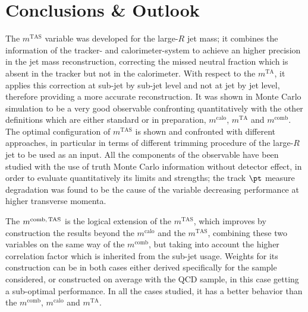 \documentclass[UKenglish,texlive=2013]{\ATLASLATEXPATH atlasdoc}
\newcommand{\mta}{\ensuremath{m^\textrm{TA}}\xspace}
\newcommand{\mtas}{\ensuremath{m^\textrm{TAS}}\xspace}
\newcommand{\mcal}{\ensuremath{m^\textrm{calo}}\xspace}
\newcommand{\mcomb}{\ensuremath{m^\textrm{comb}}\xspace}
\newcommand{\mcombtas}{\ensuremath{m^\textrm{comb,\,TAS}}\xspace}
\newcommand{\iqr}{\ensuremath{\frac{1}{2}\: \times\: 68\% \:\textrm{IQnR/median}}\xspace}
\begin{document}
\section{Conclusions \& Outlook}
\label{sec:conclusions}
The \mtas variable was developed for the large-$R$ jet mass; it combines the information of the tracker- and calorimeter-system to achieve an higher precision in the jet mass reconstruction, correcting the missed neutral fraction which is absent in the tracker but not in the calorimeter.
With respect to the $\mta$, it applies this correction at sub-jet by sub-jet level and not at jet by jet level, therefore providing a more accurate reconstruction. 
It was shown in Monte Carlo simulation to be a very good observable confronting quantitatively with the other definitions which are either standard or in preparation, $\mcal$, $\mta$ and $\mcomb$.
The optimal configuration of $\mtas$ is shown and confronted with different approaches, in particular in terms of different trimming procedure of the large-$R$ jet to be used as an input.
All the components of the observable have been studied with the use of truth Monte Carlo information without detector effect, in order to evaluate quantitatively its limits and strengths; the track $\pt$ measure degradation was found to be the cause of the variable decreasing performance at higher transverse momenta.

The $\mcombtas$ is the logical extension of the $\mtas$, which improves by construction the results beyond the $\mcal$ and the $\mtas$, combining these two variables on the same way of the $\mcomb$, but taking into account the higher correlation factor which is inherited from the sub-jet usage.
Weights for its construction can be in both cases either derived specifically for the sample considered, or constructed on average with the QCD sample, in this case getting a sub-optimal performance. 
In all the cases studied, it has a better behavior than the $\mcomb$, $\mcal$ and $\mta$.
\end{document}
